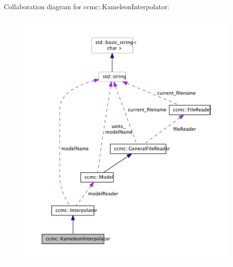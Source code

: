 Collaboration diagram for ccmc\-:\-:Kameleon\-Interpolator\-:\nopagebreak
\begin{figure}[H]
\begin{center}
\leavevmode
\includegraphics[width=350pt]{classccmc_1_1_kameleon_interpolator__coll__graph}
\end{center}
\end{figure}
